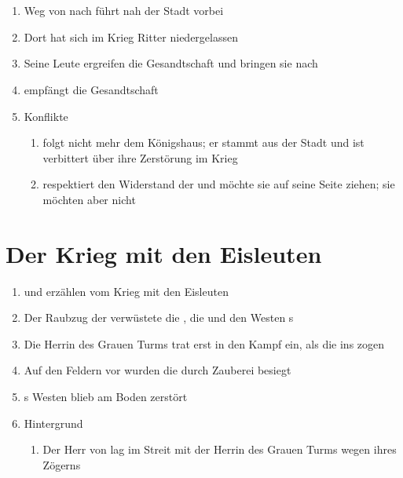 \documentclass[12pt,a4paper,onecolumn,oneside,ngerman]{book}
\begin{document}
\chapter[Der Weg am Fluss]{}
\begin{enumerate}
  \item Weg von {\Mundis} nach {\Rhin} führt nah der Stadt {\Golrin} vorbei
  \item Dort hat sich im Krieg Ritter {\Galadin} niedergelassen
  \item Seine Leute ergreifen die Gesandtschaft und bringen sie nach {\Golrin}
  \item {\Galadin} empfängt die Gesandtschaft
  \item Konflikte
  \begin{enumerate}
    \item {\Galadin} folgt nicht mehr dem Königshaus; er stammt aus der Stadt und ist verbittert über ihre Zerstörung im Krieg
    \item {\Galadin} respektiert den Widerstand der {\Schattenlaufer} und möchte sie auf seine Seite ziehen; sie möchten aber nicht
  \end{enumerate}
\end{enumerate}

\chapter[Galadin und Arn erzählen vom Krieg mit den Eisleuten]{Der Krieg mit den Eisleuten}
\begin{enumerate}
  \item {\Galadin} und {\Arn} erzählen vom Krieg mit den Eisleuten
  \item Der  Raubzug der {\Eisleute} verwüstete die {\Nordmark}, die {\Bergmark} und den Westen {\Rhingell}s
  \item Die Herrin des Grauen Turms trat erst in den Kampf ein, als die {\Eisleute} ins {\Enland} zogen
  \item Auf den Feldern vor {\Tern} wurden die {\Eisleute} durch Zauberei besiegt
  \item {\Rhingell}s Westen blieb am Boden zerstört
  \item Hintergrund
  \begin{enumerate}
    \item Der Herr von {\Bornhold} lag im Streit mit der Herrin des Grauen Turms wegen ihres Zögerns 
  \end{enumerate}
\end{enumerate}
 
\end{document}
